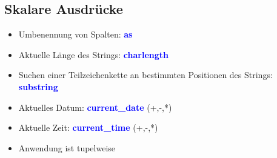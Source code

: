 \documentclass{scrartcl}
\newcommand{\key}[1]{{\textcolor{blue}{\textbf{#1}}}}
\newcommand{\select}{\textbf{select }}
\newcommand{\from}{\textbf{from }}
\begin{document}
\subsection{Skalare Ausdrücke}

\begin{itemize}
	\itemsep0em
	\item Umbenennung von Spalten: \key{as}
	\item Aktuelle Länge des Strings: \key{charlength}
	\item Suchen einer Teilzeichenkette an bestimmten Positionen des Strings: \key{substring}
	\item Aktuelles Datum: \key{current\_date} (+,-,*)
	\item Aktuelle Zeit: \key{current\_time} (+,-,*)
	\item Anwendung ist tupelweise
\end{itemize}

%
%
%
%
\end{document}
